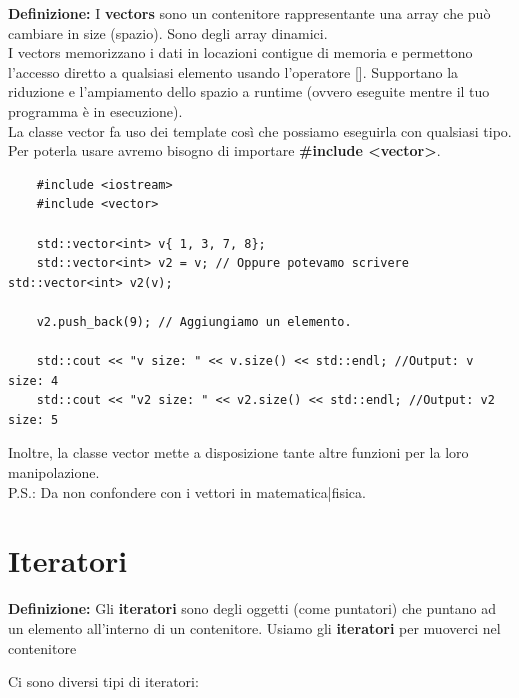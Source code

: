 \textsf{\small \textbf{Definizione:} I \textbf{vectors} sono un contenitore rappresentante una array che può cambiare in size (spazio). Sono degli array dinamici.} \\

\textsf{\small I vectors memorizzano i dati in locazioni contigue di memoria e permettono l'accesso diretto a qualsiasi elemento usando l'operatore []. Supportano la riduzione e l'ampiamento dello spazio a runtime (ovvero eseguite mentre il tuo programma è in esecuzione).} \\

\textsf{\small La classe vector fa uso dei template così che possiamo eseguirla con qualsiasi tipo. Per poterla usare avremo bisogno di importare \textbf{\#include <vector>}.} \\

\begin{lstlisting}
	#include <iostream>
	#include <vector>
	
	std::vector<int> v{ 1, 3, 7, 8};
	std::vector<int> v2 = v; // Oppure potevamo scrivere std::vector<int> v2(v);
	
	v2.push_back(9); // Aggiungiamo un elemento.
	
	std::cout << "v size: " << v.size() << std::endl; //Output: v size: 4
	std::cout << "v2 size: " << v2.size() << std::endl; //Output: v2 size: 5
\end{lstlisting}

\textsf{\small Inoltre, la classe vector mette a disposizione tante altre funzioni per la loro manipolazione.} \\

\textsf{\small P.S.: Da non confondere con i vettori in matematica|fisica.} \break


\newpage

\section{Iteratori}

\textsf{\small \textbf{Definizione: } Gli \textbf{iteratori} sono degli oggetti (come puntatori) che puntano ad un elemento all'interno di un contenitore. Usiamo gli \textbf{iteratori} per muoverci nel contenitore } \break

\textsf{\small Ci sono diversi tipi di iteratori: } \\

